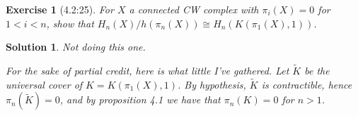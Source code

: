 \documentclass{article}
\theoremstyle{plain}
\newtheorem*{ex}{Exercise}
\theoremstyle{nonumberplain}
\newtheorem{sol}{Solution}
\begin{document}
\begin{ex}[4.2:25]
For $X$ a connected CW complex with $\pi_i(X) = 0$ for $1 < i < n$, show that $H_n(X)/h(\pi_n(X)) \cong H_n(K(\pi_1(X),1))$.
\end{ex}

\begin{sol}
Not doing this one.

For the sake of partial credit, here is what little I've gathered. Let $\tilde K$ be the universal cover of $K = K(\pi_1(X),1)$. By hypothesis, $\tilde K$ is contractible, hence $\pi_n(\tilde K) = 0$, and by proposition 4.1 we have that $\pi_n(K) = 0$ for $n > 1$.
\end{sol}
\end{document}

